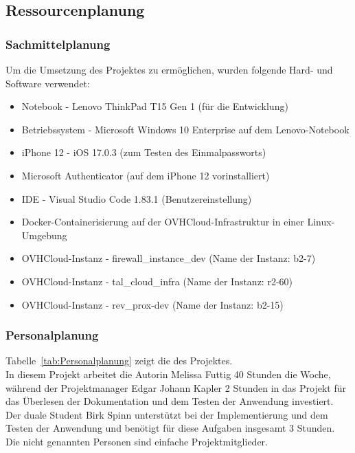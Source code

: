 \subsection{Ressourcenplanung}
\label{sec:Ressourcenplanung}

\subsubsection{Sachmittelplanung}
\label{sec:Sachmittelplanung}
Um die Umsetzung des Projektes zu ermöglichen, wurden folgende Hard- und Software verwendet:
\begin{itemize} [label=--]
	\item Notebook - Lenovo ThinkPad T15 Gen 1 (für die Entwicklung)
	\item Betriebssystem - Microsoft Windows 10 Enterprise auf dem Lenovo-Notebook
	\item iPhone 12 - iOS 17.0.3 (zum Testen des Einmalpassworts)
	\item Microsoft Authenticator (auf dem iPhone 12 vorinstalliert)
	\item \acs{IDE} - Visual Studio Code 1.83.1 (Benutzereinstellung)
	\item Docker-Containerisierung auf der OVHCloud-Infrastruktur in einer Linux-Umgebung
	\item OVHCloud-Instanz - firewall\_instance\_dev (Name der Instanz: b2-7)
	\item OVHCloud-Instanz - tal\_cloud\_infra (Name der Instanz: r2-60)
	\item OVHCloud-Instanz - rev\_prox-dev (Name der Instanz: b2-15)
\end{itemize}

\subsubsection{Personalplanung}
\label{sec:Personalplanung}
Tabelle~\ref{tab:Personalplanung} zeigt die  des Projektes.
\\
In diesem Projekt arbeitet die Autorin Melissa Futtig 40 Stunden die Woche, während der Projektmanager Edgar Johann Kapler 
2 Stunden in das Projekt für das Überlesen der Dokumentation und dem Testen der Anwendung investiert. Der duale Student Birk 
Spinn unterstützt bei der Implementierung und dem Testen der Anwendung und benötigt für diese Aufgaben insgesamt 3 Stunden. 
Die nicht genannten Personen sind einfache Projektmitglieder.


